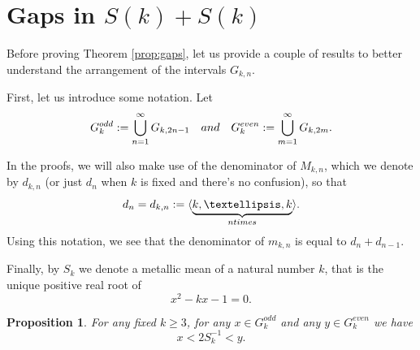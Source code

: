 \documentclass{amsart}
\newtheorem{proposition}[theorem]{Proposition}
\theoremstyle{definition}
\newcommand{\0}{\mbf 0}%
\renewcommand{\text}{\textup}
\begin{document}





\section{Gaps in $S(k)+S(k)$}\label{sec:gaps}



Before proving Theorem \ref{prop:gaps}, let us provide a couple of results to better understand the arrangement of the intervals $G_{k,n}$. 

First, let us introduce some notation. Let
$$
G_{k}^{odd}:=\bigcup_{n=1}^\infty G_{k,2n-1}  \quad\text{ and } \quad G_{k}^{even} := \bigcup_{m=1}^\infty G_{k,2m}.
$$

In the proofs, we will also make use of the denominator of $M_{k,n}$, which we denote by $d_{k,n}$ (or just $d_n$ when $k$ is fixed and there's no confusion), so that
$$
d_n=d_{k,n} := \langle \underbrace{k,\ldots,k}_{n \text{ times }} \rangle. 
$$
Using this notation, we see that the denominator of $m_{k,n}$ is equal to $d_n+d_{n-1}$.

Finally, by $S_k$ we denote a metallic mean of a natural number $k$, that is the unique positive real root of 
$$x^2-kx-1=0.$$

\begin{proposition}\label{prop:metall}
For any fixed $k\geq3$, for any $x\in G_{k}^{odd}$ and any $y\in G_{k}^{even}$ we have 
$$
x < 2S_k^{-1} < y.
$$
\end{proposition}
\end{document}
